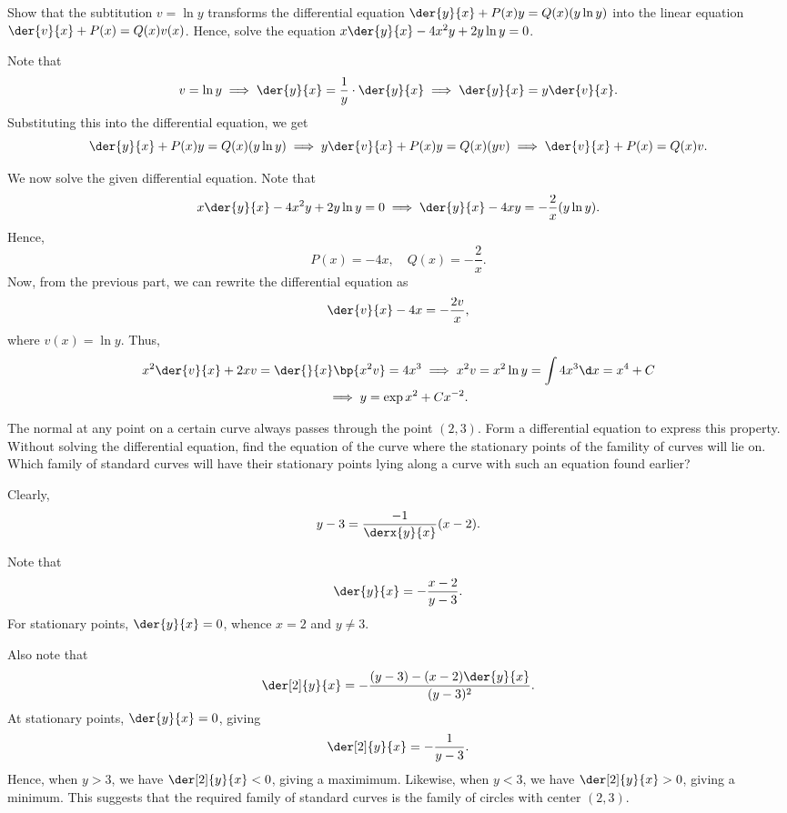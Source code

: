 \begin{problem}
    Show that the subtitution $v = \ln y$ transforms the differential equation $\der{y}{x} + P(x) y = Q(x) (y \ln y)$ into the linear equation $\der{v}{x} + P(x) = Q(x)v(x)$. Hence, solve the equation $x \der{y}{x} - 4x^2 y + 2y \ln y = 0$.
\end{problem}
\begin{solution}
    Note that \[v = \ln y \implies \der{y}{x} = \frac1y \cdot \der{y}{x} \implies \der{y}{x} = y \der{v}{x}.\] Substituting this into the differential equation, we get \[\der{y}{x} + P(x) y = Q(x) (y \ln y) \implies y \der{v}{x} + P(x) y = Q(x) (y v) \implies \der{v}{x} + P(x) = Q(x) v.\]
    
    We now solve the given differential equation. Note that \[x \der{y}{x} - 4x^2 y + 2y \ln y = 0 \implies \der{y}{x} - 4x y = -\frac2x (y\ln y).\] Hence, \[P(x) = -4x, \quad Q(x) = -\frac2x.\] Now, from the previous part, we can rewrite the differential equation as \[\der{v}{x} - 4x = -\frac{2v}{x},\] where $v(x) = \ln y$. Thus,
    \begin{gather*}
        x^2 \der{v}{x} + 2x v = \der{}{x} \bp{x^2 v} = 4x^3 \implies x^2 v = x^2 \ln y = \int 4x^3 \d x = x^4 + C \\
        \implies y = \exp{x^2 + Cx^{-2}}.
    \end{gather*}
\end{solution}

\begin{problem}
    The normal at any point on a certain curve always passes through the point $(2, 3)$. Form a differential equation to express this property. Without solving the differential equation, find the equation of the curve where the stationary points of the famility of curves will lie on. Which family of standard curves will have their stationary points lying along a curve with such an equation found earlier?
\end{problem}
\begin{solution}
    Clearly, \[y - 3 = \frac{-1}{\derx{y}{x}} (x- 2).\]
    
    Note that \[\der{y}{x} = -\frac{x-2}{y-3}.\] For stationary points, $\der{y}{x} = 0$, whence $x = 2$ and $y \neq 3$.
    
    Also note that \[\der[2]{y}{x} = -\frac{(y-3) - (x-2)\der{y}{x}}{(y-3)^2}.\] At stationary points, $\der{y}{x} = 0$, giving \[\der[2]{y}{x} = -\frac1{y-3}.\] Hence, when $y > 3$, we have $\der[2]{y}{x} < 0$, giving a maximimum. Likewise, when $y < 3$, we have $\der[2]{y}{x} > 0$, giving a minimum. This suggests that the required family of standard curves is the family of circles with center $(2, 3)$.
\end{solution}

